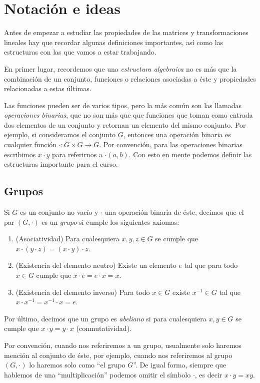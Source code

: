 \section{Notación e ideas}

Antes de empezar a estudiar las propiedades de las matrices y transformaciones lineales hay que recordar algunas definiciones importantes, así como las estructuras con las que vamos a estar trabajando.

En primer lugar, recordemos que una \emph{estructura algebraica} no es más que la combinación de un conjunto, funciones o relaciones asociadas a éste y propiedades relacionadas a estas últimas.

Las funciones pueden ser de varios tipos, pero la más común son las llamadas \emph{operaciones binarias}, que no son más que que funciones que toman como entrada dos elementos de un conjunto y retornan un elemento del mismo conjunto. Por ejemplo, si consideramos el conjunto $G$, entonces una operación binaria es cualquier función $\cdot \colon  G \times G \to G$. Por convención, para las operaciones binarias escribimos $x \cdot y$  para referirnos a $\cdot(a,b)$. Con esto en mente podemos definir las estructuras importante para el curso.


\subsection{Grupos}

\begin{defi}
  Si $G$ es un conjunto no vacío y $\cdot$ una operación binaria de éste, decimos que el par $(G, \cdot)$ es un \emph{grupo} si cumple los siguientes axiomas:
  \begin{enumerate}
    \item (Asociatividad) Para cualesquiera $x, y, z \in G$ se cumple que $x\cdot(y\cdot z) = (x\cdot y)\cdot z$.
    \item (Existencia del elemento neutro) Existe un elemento $e$ tal que para todo $x \in G$ cumple que $x\cdot e = e\cdot x = x$.
    \item (Existencia del elemento inverso) Para todo $x \in G$ existe $x^{-1} \in G$ tal que $x\cdot x^{-1} = x^{-1}\cdot x = e$.
  \end{enumerate}
  Por último, decimos que un grupo es \emph{abeliano} si para cualesquiera $x,y \in G$ se cumple que $x\cdot y = y \cdot x$ (conmutatividad).
\end{defi}

Por convención, cuando nos referiremos a un grupo, usualmente solo haremos mención al conjunto de éste, por ejemplo, cuando nos referiremos al grupo $(G, \cdot)$ lo haremos solo como ``el grupo $G$''. De igual forma, siempre que hablemos de una ``multiplicación'' podemos omitir el símbolo $\cdot$, es decir $x \cdot y = xy$.

